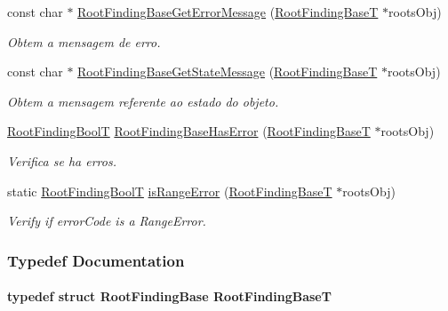\begin{CompactItemize}
const char $\ast$ \hyperlink{group____roots_gcc5a0a8948e4b02a878f8d534c0bc982}{RootFindingBaseGetErrorMessage} (\hyperlink{structRootFindingBase}{RootFindingBaseT} $\ast$rootsObj)
\begin{CompactList}\small\item\em Obtem a mensagem de erro. \item\end{CompactList}\item 
const char $\ast$ \hyperlink{group____roots_ga2434bfeb9592ff54df8601cd1a9a04d}{RootFindingBaseGetStateMessage} (\hyperlink{structRootFindingBase}{RootFindingBaseT} $\ast$rootsObj)
\begin{CompactList}\small\item\em Obtem a mensagem referente ao estado do objeto. \item\end{CompactList}\item 
\hyperlink{RootFindingCommon_8h_31228d356f5429fa5ba7f206e4dee12f}{RootFindingBoolT} \hyperlink{group____roots_gec634820d94c4205729589fc44676b72}{RootFindingBaseHasError} (\hyperlink{structRootFindingBase}{RootFindingBaseT} $\ast$rootsObj)
\begin{CompactList}\small\item\em Verifica se ha erros. \item\end{CompactList}\item 
static \hyperlink{RootFindingCommon_8h_31228d356f5429fa5ba7f206e4dee12f}{RootFindingBoolT} \hyperlink{group____roots_g0a4ce2e4b5aee1fe78afe76b2a2bf71e}{isRangeError} (\hyperlink{structRootFindingBase}{RootFindingBaseT} $\ast$rootsObj)
\begin{CompactList}\small\item\em Verify if errorCode is a RangeError. \item\end{CompactList}\end{CompactItemize}


\subsubsection{Typedef Documentation}
\hypertarget{group____roots_gdb81038cc3cdc5d4af8be9fe0c45f11a}{
\paragraph[RootFindingBaseT]{\setlength{\rightskip}{0pt plus 5cm}typedef struct {\bf RootFindingBase} {\bf RootFindingBaseT}}\hfill}
\label{group____roots_gdb81038cc3cdc5d4af8be9fe0c45f11a}


